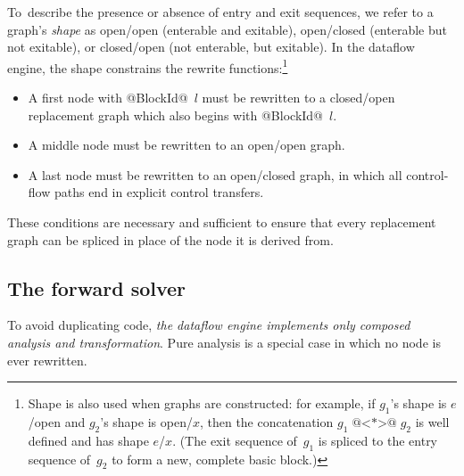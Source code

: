 \documentclass[blockstyle,preprint,natbib,nocopyrightspace]{sigplanconf}
\newcommand{\authornote}[1]{{\em #1}}
\def\authornote#1{\unskip\relax}
\newcommand{\norman}[1]{\authornote{NR: #1}}
\let\remark\norman
\def\finalremark#1{\relax}
\newcommand\seclabel[1]{\label{sec:#1}}
\begin{document}
To~describe the presence or absence of entry and exit sequences, we
refer to a graph's \emph{shape} as open/open (enterable and exitable),
open/closed (enterable but not exitable), or closed/open (not
enterable, but exitable).  
In
the dataflow engine, the shape constrains the rewrite
functions:\footnote {Shape is also used when graphs are constructed:
for
example, if $g_1$'s shape is $e$/open and $g_2$'s shape is open/$x$,
then the concatenation $g_1 \mathbin{\mbox{@<*>@}} g_2$ is well defined and has shape
$e$/$x$.  (The exit sequence of~$g_1$ is spliced to the entry sequence
of~$g_2$ to form a new, complete basic block.)}
\begin{itemize}
\item
A first node with @BlockId@~$l$ must be rewritten to a closed/open
replacement graph which also begins with @BlockId@~$l$.
\item
A middle node must be rewritten to an open/open graph.
\item
A last node must be rewritten to an open/closed graph, in 
which all control-flow
paths end in explicit control transfers.
\end{itemize}
These conditions are necessary and sufficient to ensure that 
every replacement graph can be spliced in place of the node it is derived from.


\subsection{The forward solver}

\seclabel{forward-solver}

\finalremark{What does the reader gain from here on?}

To avoid duplicating code,
\emph{the dataflow engine implements only composed
analysis and transformation}.
Pure analysis is a special case in which no node is
ever rewritten.


\finalremark{How and where do we say what's new over
\citet{ramsey-dias:applicative-flow-graph}?}
\end{document}
